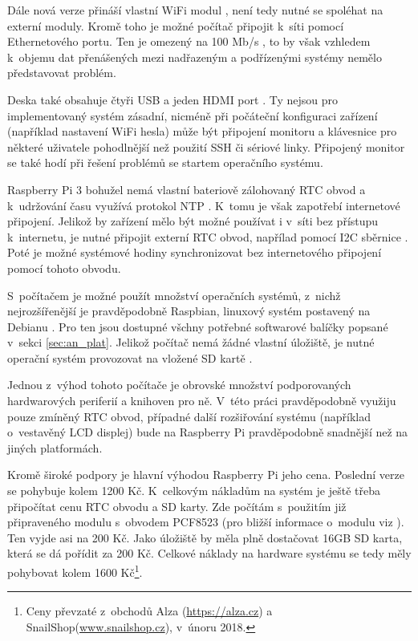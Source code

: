 Dále nová verze přináší vlastní WiFi modul \cite{rpi_benchoff}, není tedy nutné se spoléhat na externí moduly. Kromě toho je možné počítač připojit k~síti pomocí Ethernetového portu. Ten je omezený na 100 Mb/s \cite{rpi_benchoff}, to by však vzhledem k~objemu dat přenášených mezi nadřazeným a podřízenými systémy nemělo představovat problém.

Deska také obsahuje čtyři USB a jeden HDMI port \cite{rpi_benchoff}. Ty nejsou pro implementovaný systém zásadní, nicméně při počáteční konfiguraci zařízení (například nastavení WiFi hesla) může být připojení monitoru a klávesnice pro některé uživatele pohodlnější než použití SSH či sériové linky. Připojený monitor se také hodí při řešení problémů se startem operačního systému.

Raspberry Pi 3 bohužel nemá vlastní bateriově zálohovaný RTC obvod a k~udržování času využívá protokol NTP \cite{rpi_rtc_ada}. K~tomu je však zapotřebí internetové připojení. Jelikož by zařízení mělo být možné používat i v~síti bez přístupu k~internetu, je nutné připojit externí RTC obvod, napřílad pomocí I2C sběrnice \cite{rpi_rtc_ada}. Poté je možné systémové hodiny synchronizovat bez internetového připojení pomocí tohoto obvodu.

S~počítačem je možné použít množství operačních systémů, z~nichž nejrozšířenější je pravděpodobně Raspbian, linuxový systém postavený na Debianu \cite{raspbian_faq}. Pro ten jsou dostupné všchny potřebné softwarové balíčky popsané v~sekci \ref{sec:an_plat}. Jelikož počítač nemá žádné vlastní úložiště, je nutné operační systém provozovat na vložené SD kartě \cite{rpi_benchoff}.

Jednou z~výhod tohoto počítače je obrovské množství podporovaných hardwarových periferií a knihoven pro ně. V~této práci pravděpodobně využiju pouze zmíněný RTC obvod, případné další rozšiřování systému (například o~vestavěný LCD displej) bude na Raspberry Pi pravděpodobně snadnější než na jiných platformách.

Kromě široké podpory je hlavní výhodou Raspberry Pi jeho cena. Poslední verze se pohybuje kolem 1200 Kč. K~celkovým nákladům na systém je ještě třeba připočítat cenu RTC obvodu a SD karty. Zde počítám s~použitím již připraveného modulu s~obvodem PCF8523 (pro bližší informace o~modulu viz \cite{rpi_rtc_ada}). Ten vyjde asi na 200 Kč. Jako úložiště by měla plně dostačovat 16GB SD karta, která se dá pořídit za 200 Kč. Celkové náklady na hardware systému se tedy měly pohybovat kolem 1600 Kč\footnote{Ceny převzaté z~obchodů Alza (\url{https://alza.cz}) a SnailShop(\url{www.snailshop.cz}), v~únoru 2018.}.

